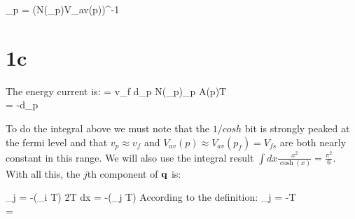 \documentclass[a4paper,11pt]{article}
\begin{document}
\bea
\tau_p = (N(\epsilon_p)V_{av}(p))^{-1}
\eea

\section*{1c}
The energy current is:
\bea
\vq = v_f \int d\xi_p N(\epsilon_p)\hp\xi_p  A(p)\hp\cdot\nabla T \\
= -\int d\xi_p  \hp {}
\eea

To do the integral above we must note that the $1/cosh$ bit is strongly peaked at the fermi level and that $v_p \approx v_f$ and $V_{av}(p)\approx V_{av}(p_f) = V_{fs}$ are both nearly constant in this range. We will also use the integral result $\int dx\frac{x^2}{\cosh(x)} = \frac{\pi^2}{6}$. With all this, the $j$th component of ${\bf q}$ is:

\bea
\vq_j = -(\delta_i T) \int 2T dx  = -(\delta_j T)
\eea
According to the definition:
\bea
\vq_j = -\kappa \nabla T \\
\kappa = 
\eea
\end{document}
